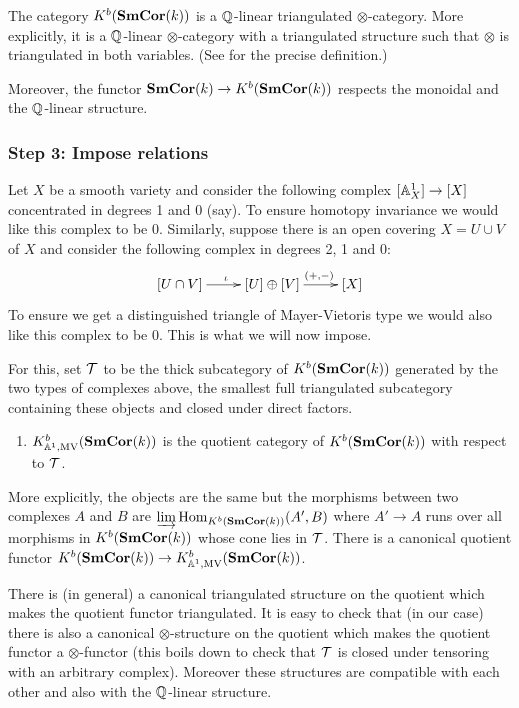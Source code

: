 \begin{rem}
  The category $K^b(\mathbf{SmCor}(k))$ is a $\mathbb{Q}$-linear triangulated
  $\otimes$-category. More explicitly, it is a $\mathbb{Q}$-linear
  $\otimes$-category with a triangulated structure such that $\otimes$
  is triangulated in both variables. (See\cite[8A]{MVW-motcoh} for the
  precise definition.)

  Moreover, the functor $\mathbf{SmCor}(k)\to K^b(\mathbf{SmCor}(k))$ respects the
  monoidal and the $\mathbb{Q}$-linear structure.
\end{rem}

\subsubsection{Step 3: Impose relations}
Let $X$ be a smooth variety and consider the following complex
$[\mathbb{A}^{1}_{X}]\to [X]$ concentrated in degrees 1 and 0 (say). To ensure
homotopy invariance we would like this complex to be 0. Similarly,
suppose there is an open covering $X=U\cup V$ of $X$ and consider the
following complex in degrees 2, 1 and 0:
\begin{equation*}
  \xymatrix{
[U \cap V] \ar[r]^{\iota} & [U] \oplus [V] \ar[r]^{\quad(+, -)} & [X] 
}
\end{equation*}
To ensure we get a distinguished triangle of Mayer-Vietoris type we
would also like this complex to be 0. This is what we will now impose.

For this, set ${\cal T}$ to be the thick subcategory of
$K^b(\mathbf{SmCor}(k))$ generated by the two types of complexes above, \ie{}
the smallest full triangulated subcategory containing these objects
and closed under direct factors.
\begin{defn}
  \begin{enumerate}
  \item $K^b_{\mathbb{A}^{1},\mathrm{MV}}(\mathbf{SmCor}(k))$ is the quotient category
    of $K^b(\mathbf{SmCor}(k))$ with respect to ${\cal T}$.
  \end{enumerate}
\end{defn}

More explicitly, the objects are the same but the morphisms between
two complexes $A$ and $B$ are $\varinjlim \mathrm{Hom}_{K^b(\mathbf{SmCor}(k))}(A',B)$
where $A'\to A$ runs over all morphisms in $K^b(\mathbf{SmCor}(k))$ whose cone
lies in ${\cal T}$. There is a canonical quotient functor
$K^b(\mathbf{SmCor}(k))\to K^b_{\mathbb{A}^{1},\mathrm{MV}}(\mathbf{SmCor}(k))$.
\begin{rem}
There is (in general) a canonical triangulated structure on the
quotient which makes the quotient functor triangulated. It is easy to
check that (in our case) there is also a canonical $\otimes$-structure
on the quotient which makes the quotient functor a
$\otimes$-functor (this boils down to check that ${\cal T}$ is closed
under tensoring with an arbitrary complex). Moreover these structures
are compatible with each other and also with the $\mathbb{Q}$-linear structure.
\end{rem}

